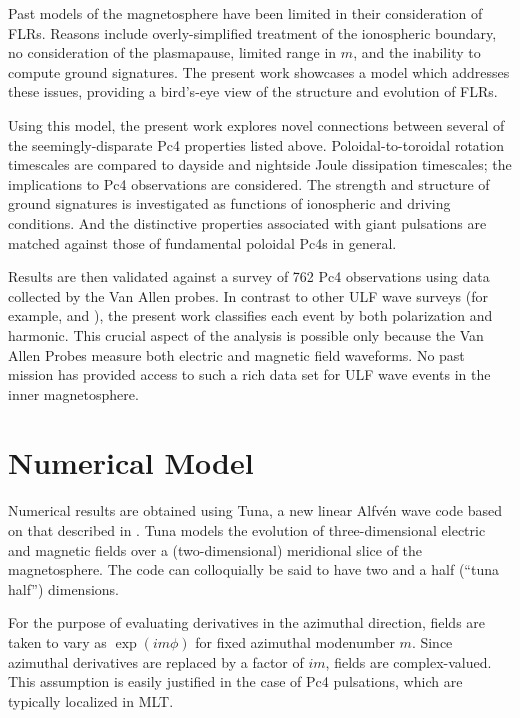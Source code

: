 \documentclass{article}
\newcommand{\Alfven}{Alfv\'en\xspace}
\newcommand{\lr}[1]{ \left( #1 \right) }
\renewcommand{\arg}[1]{\!\lr{#1}}
\newcommand{\azm}{\ensuremath{m}\xspace}
\begin{document}
Past models of the magnetosphere have been limited in their consideration of FLRs. Reasons include overly-simplified treatment of the ionospheric boundary, no consideration of the plasmapause, limited range in \azm, and the inability to compute ground signatures. The present work showcases a model which addresses these issues, providing a bird’s-eye view of the structure and evolution of FLRs.

Using this model, the present work explores novel connections between several of the seemingly-disparate Pc4 properties listed above. Poloidal-to-toroidal rotation timescales are compared to dayside and nightside Joule dissipation timescales; the implications to Pc4 observations are considered. The strength and structure of ground signatures is investigated as functions of ionospheric and driving conditions. And the distinctive properties associated with giant pulsations are matched against those of fundamental poloidal Pc4s in general.

Results are then validated against a survey of 762 Pc4 observations using data collected by the Van Allen probes. In contrast to other ULF wave surveys (for example, \cite{dai_2015} and \cite{motoba_2015}), the present work classifies each event by both polarization and harmonic. This crucial aspect of the analysis is possible only because the Van Allen Probes measure both electric and magnetic field waveforms. No past mission has provided access to such a rich data set for ULF wave events in the inner magnetosphere.


\section{Numerical Model}

Numerical results are obtained using Tuna, a new linear \Alfven wave code based on that described in \cite{lysak_2013}. Tuna models the evolution of three-dimensional electric and magnetic fields over a (two-dimensional) meridional slice of the magnetosphere. The code can colloquially be said to have two and a half (``tuna half'') dimensions.

For the purpose of evaluating derivatives in the azimuthal direction, fields are taken to vary as $\exp \arg{i \azm \phi}$ for fixed azimuthal modenumber \azm. Since azimuthal derivatives are replaced by a factor of $i \azm$, fields are complex-valued. This assumption is easily justified in the case of Pc4 pulsations, which are typically localized in MLT\cite{anderson_1990,dai_2015,engebretson_1992,liu_2009}.
\end{document}
